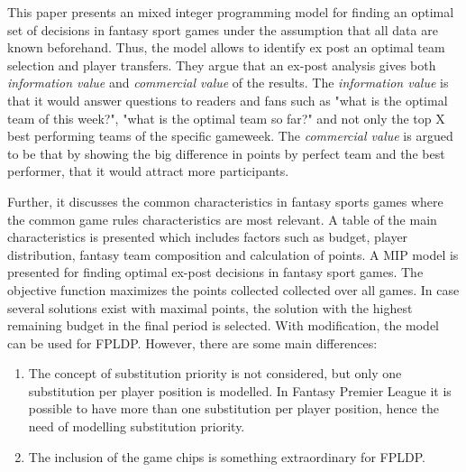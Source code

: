 This paper presents an mixed integer programming model for finding an optimal set of decisions in fantasy sport games under the assumption that all data are known beforehand. Thus, the model allows to identify ex post an optimal team selection and player transfers. They argue that an ex-post analysis gives both \textit{information value} and \textit{commercial value} of the results. The \textit{information value} is that it would answer questions to readers and fans such as "what is the optimal team of this week?", "what is the optimal team so far?" and not only the top X best performing teams of the specific gameweek. The \textit{commercial value} is argued to be that by showing the big difference in points by perfect team and the best performer, that it would attract more participants. 

\newpar

Further, it discusses the common characteristics in fantasy sports games where the common game rules characteristics are most relevant. A table of the main characteristics is presented which includes factors such as budget, player distribution, fantasy team composition and calculation of points. A MIP model is presented for finding optimal ex-post decisions in fantasy sport games. The objective function maximizes the points collected collected over all games. In case several solutions exist with maximal points, the solution with the highest remaining budget in the final period is selected.  With modification, the model can be used for FPLDP. However, there are some main differences: 

\begin{enumerate}
    \item The concept of substitution priority is not considered, but only one substitution per player position is modelled. In Fantasy Premier League it is possible to have more than one substitution per player position, hence the need of modelling substitution priority. 
    \item The inclusion of the game chips is something extraordinary for FPLDP. 
\end{enumerate}


